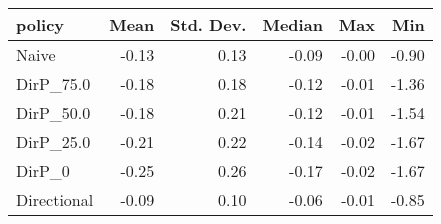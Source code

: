 \begin{tabular}{lrrrrr}
\toprule
     policy &  Mean &  Std. Dev. &  Median &   Max &   Min \\
\midrule
      Naive & -0.13 &       0.13 &   -0.09 & -0.00 & -0.90 \\
  DirP\_75.0 & -0.18 &       0.18 &   -0.12 & -0.01 & -1.36 \\
  DirP\_50.0 & -0.18 &       0.21 &   -0.12 & -0.01 & -1.54 \\
  DirP\_25.0 & -0.21 &       0.22 &   -0.14 & -0.02 & -1.67 \\
     DirP\_0 & -0.25 &       0.26 &   -0.17 & -0.02 & -1.67 \\
Directional & -0.09 &       0.10 &   -0.06 & -0.01 & -0.85 \\
\bottomrule
\end{tabular}
